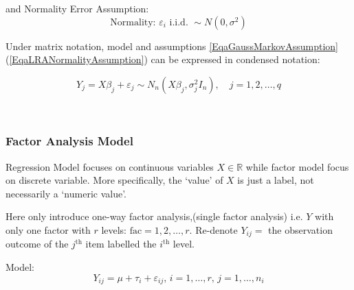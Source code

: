 and Normality Error Assumption: 
\begin{equation}\label{EqaLRANormalityAssumption}
    \text{Normality: }\varepsilon _i \text{ i.i.d. }\sim N(0,\sigma ^2) 
\end{equation}

    Under matrix notation, model and assumptions \autoref{EqaGaussMarkovAssumption}(\autoref{EqaLRANormalityAssumption}) can be expressed in condensed notation:

    \begin{equation}
        Y_j=X\beta_j +\varepsilon_j  \sim N_n(X\beta_j ,\sigma_j^2I_n),\quad j=1,2,\ldots,q
    \end{equation}

\\


\subsubsection{Factor Analysis Model}
    Regression Model focuses on continuous variables $ X\in\mathbb{R} $ while factor model focus on discrete variable. More specifically, the `value' of $ X $ is just a label, not necessarily a `numeric value'.

    Here only introduce one-way factor analysis,(single factor analysis) i.e. $ Y $ with only one factor with $ r $ levels: $ \mathrm{fac} =1,2,\ldots,r $. Re-denote $ Y_{ij}= $ the observation outcome of the $ j^\mathrm{th}  $ item labelled the $ i^\mathrm{th}  $ level.

    Model:
    \begin{equation}
        Y_{ij}=\mu +\tau_i+\varepsilon _{ij} ,\, i=1,\ldots,r,\, j=1,\ldots,n_i
    \end{equation}
    
